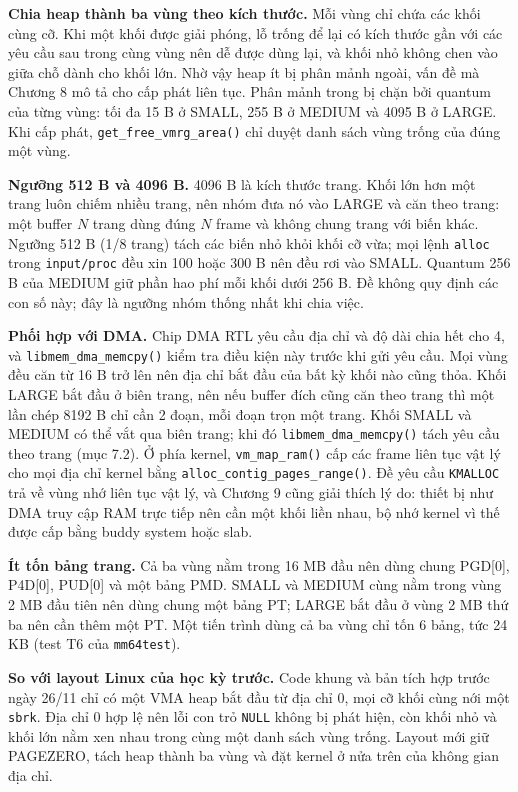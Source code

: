 \documentclass[12pt,a4paper]{article}
\begin{document}
	\medskip
	\noindent\textbf{Chia heap thành ba vùng theo kích thước.} Mỗi vùng chỉ chứa các khối cùng cỡ. Khi một khối được giải phóng, lỗ trống để lại có kích thước gần với các yêu cầu sau trong cùng vùng nên dễ được dùng lại, và khối nhỏ không chen vào giữa chỗ dành cho khối lớn. Nhờ vậy heap ít bị phân mảnh ngoài, vấn đề mà Chương 8 mô tả cho cấp phát liên tục. Phân mảnh trong bị chặn bởi quantum của từng vùng: tối đa 15 B ở SMALL, 255 B ở MEDIUM và 4095 B ở LARGE. Khi cấp phát, \texttt{get\_free\_vmrg\_area()} chỉ duyệt danh sách vùng trống của đúng một vùng.

	\medskip
	\noindent\textbf{Ngưỡng 512 B và 4096 B.} 4096 B là kích thước trang. Khối lớn hơn một trang luôn chiếm nhiều trang, nên nhóm đưa nó vào LARGE và căn theo trang: một buffer \(N\) trang dùng đúng \(N\) frame và không chung trang với biến khác. Ngưỡng 512 B (1/8 trang) tách các biến nhỏ khỏi khối cỡ vừa; mọi lệnh \texttt{alloc} trong \texttt{input/proc} đều xin 100 hoặc 300 B nên đều rơi vào SMALL. Quantum 256 B của MEDIUM giữ phần hao phí mỗi khối dưới 256 B. Đề không quy định các con số này; đây là ngưỡng nhóm thống nhất khi chia việc.

	\medskip
	\noindent\textbf{Phối hợp với DMA.} Chip DMA RTL yêu cầu địa chỉ và độ dài chia hết cho 4, và \texttt{libmem\_dma\_memcpy()} kiểm tra điều kiện này trước khi gửi yêu cầu. Mọi vùng đều căn từ 16 B trở lên nên địa chỉ bắt đầu của bất kỳ khối nào cũng thỏa. Khối LARGE bắt đầu ở biên trang, nên nếu buffer đích cũng căn theo trang thì một lần chép 8192 B chỉ cần 2 đoạn, mỗi đoạn trọn một trang. Khối SMALL và MEDIUM có thể vắt qua biên trang; khi đó \texttt{libmem\_dma\_memcpy()} tách yêu cầu theo trang (mục 7.2). Ở phía kernel, \texttt{vm\_map\_ram()} cấp các frame liên tục vật lý cho mọi địa chỉ kernel bằng \texttt{alloc\_contig\_pages\_range()}. Đề yêu cầu \texttt{KMALLOC} trả về vùng nhớ liên tục vật lý, và Chương 9 cũng giải thích lý do: thiết bị như DMA truy cập RAM trực tiếp nên cần một khối liền nhau, bộ nhớ kernel vì thế được cấp bằng buddy system hoặc slab.

	\medskip
	\noindent\textbf{Ít tốn bảng trang.} Cả ba vùng nằm trong 16 MB đầu nên dùng chung PGD[0], P4D[0], PUD[0] và một bảng PMD. SMALL và MEDIUM cùng nằm trong vùng 2 MB đầu tiên nên dùng chung một bảng PT; LARGE bắt đầu ở vùng 2 MB thứ ba nên cần thêm một PT. Một tiến trình dùng cả ba vùng chỉ tốn 6 bảng, tức 24 KB (test T6 của \texttt{mm64test}).

	\medskip
	\noindent\textbf{So với layout Linux của học kỳ trước.} Code khung và bản tích hợp trước ngày 26/11 chỉ có một VMA heap bắt đầu từ địa chỉ 0, mọi cỡ khối cùng nới một \texttt{sbrk}. Địa chỉ 0 hợp lệ nên lỗi con trỏ \texttt{NULL} không bị phát hiện, còn khối nhỏ và khối lớn nằm xen nhau trong cùng một danh sách vùng trống. Layout mới giữ PAGEZERO, tách heap thành ba vùng và đặt kernel ở nửa trên của không gian địa chỉ.
\end{document}
